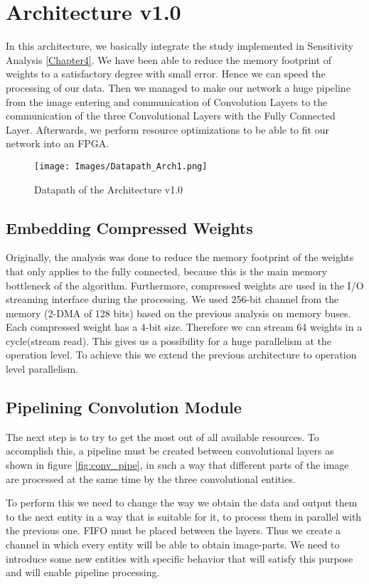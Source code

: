 \section{Architecture v1.0}
In this architecture, we basically integrate the study implemented in Sensitivity Analysis \ref{Chapter4}. We have been able to reduce the memory footprint of weights to a satisfactory degree with small error. Hence we can speed the processing of our data. Then we managed to make our network a huge pipeline from the image entering and communication of Convolution Layers to the communication of the three Convolutional Layers with the Fully Connected Layer. Afterwards, we perform resource optimizations to be able to fit our network into an FPGA.
 
 
 \begin{figure}[h]
\centering
\texttt{[image: Images/Datapath\_Arch1.png]} 
\decoRule
\caption[Datapath of the Architecture v1.0]{Datapath of the Architecture v1.0}
\label{fig:27}
\end{figure}

\subsection{Embedding Compressed Weights}
Originally, the analysis was done to reduce the memory footprint of the weights that only applies to the fully connected, because this is the main memory bottleneck of the algorithm. Furthermore, compressed weights are used in the I/O streaming interface during the processing. We used 256-bit channel from the memory (2-DMA of 128 bits) based on the previous analysis on memory buses. Each compressed weight has a 4-bit size. Therefore we can stream 64 weights in a cycle(stream read). This gives us a possibility for a huge parallelism at the operation level. To achieve this we extend the previous architecture to operation level parallelism.

\subsection{Pipelining Convolution Module}
The next step is to try to get the most out of all available resources. To accomplish this, a pipeline must be created between convolutional layers as shown in figure \ref{fig:conv_pipe}, in such a way that different parts of the image are processed at the same time by the three convolutional entities.


To perform this we need to change the way we obtain the data and output them to the next entity in a way that is suitable for it, to process them in parallel with the previous one. FIFO must be placed between the layers. Thus we create a channel in which every entity will be able to obtain image-parts. We need to introduce some new entities with specific behavior that will satisfy this purpose and will enable pipeline processing.



